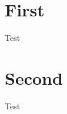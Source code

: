 \documentclass[a4paper,12pt]{article}
\begin{document}
\section{First}

\begin{refsection}
Test \cite{Scherzer1936}
\end{refsection}


\section{Second}

\begin{refsection}
Test \cite{Scherzer1936}
\end{refsection}

\printbibliography[section=1]
\printbibliography[section=2]
\end{document}
